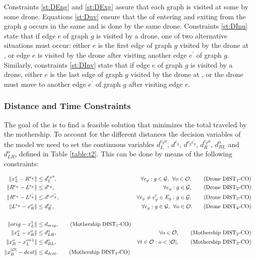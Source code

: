 \noindent 
{}  Constraints \eqref{st:DEng} and \eqref{st:DExg} assure that each graph is visited at some  by some drone. Equations \eqref{st:Duv} ensure that the  of entering and exiting from the graph $g$ occurs in the same  and is done by the same drone. Constraints \eqref{st:DInu} state that if  edge $e$ of graph $g$ is visited by a drone, one of two alternative situations must occur: either $e$ is the first edge of graph $g$ visited by the drone at , or edge $e$ is visited by the drone after visiting another edge $e^\prime$ of graph $g$. Similarly, constraints \eqref{st:DInv} state that if  edge $e$ of graph $g$ is visited by a drone, either $e$ is the last edge of graph $g$ visited by the drone at , or the drone must move to another edge $e^\prime$ of graph $g$ after visiting edge $e$.

\subsubsection*{Distance and Time Constraints}
\noindent
The goal of the \AMD\xspace is to find a feasible solution that minimizes the total  traveled by the mothership. To account for the different distances  the decision variables of the model we need to set the continuous variables $d_L^{e_go}$, $d^{e_g}$, $d^{e_ge^\prime_g}$, $d_R^{e_go}$, $d_{RL}^o$ and $d_{LR}^o$, defined in Table \ref{table:t2}. This can be done by means of the following constraints:

\begin{align*}
\|x_L^o- R^{e_g}\| & \leq  d_L^{e_go},  &\forall e_g:g\in \mathcal{G}, \:\:\forall o\in \mathcal O, \tag{Drone DIST$_{1}$-CO} \label{eq:drone-d1-async-CO}\\
\|R^{e_g}- L^{e_g}\| & \leq  d^{e_g},  &\forall e_g:g\in \mathcal{G}, \tag{Drone DIST$_{2}$-CO} \label{eq:drone-d2-async-CO}\\
\|R^{e_g}- L^{e'_g}\| & \leq  d^{e_ge'_g}, &\forall e_g\neq e_g'\in E_g:g\in \mathcal{G}, \tag{Drone DIST$_{3}$-CO} \label{eq:drone-d3-async-CO}\\
\|L^{e_g}- x_R^o\| & \leq  d_R^{e_o}, &\forall e_g:g\in \mathcal{G},\:\:\forall o\in \mathcal O. \tag{Drone DIST$_{4}$-CO} \label{eq:drone-d4-async-CO}\\\\
\|orig - x_L^1\| & \leq d_{orig}, \tag{Mothership DIST$_1$-CO}\label{eq:mothership-d1-async-CO}\\
\|x_L^o - x_R^{o}\| & \leq d_{LR}^{o}, &\forall o\in\mathcal O, \tag{Mothership DIST$_{2}$-CO}\label{eq:mothership-d3-async-CO}\\
\|x_R^o - x_L^{o+1}\| & \leq d_{RL}^{o}, &\forall t\in\mathcal O:o<|\mathcal O|, \tag{Mothership DIST$_{3}$-CO}\label{eq:mothership-d4-async-CO}\\
\|x_R^{|\mathcal O|} - dest\| & \leq d_{dest}. \tag{Mothership DIST$_4$-CO}\label{eq:mothership-d6-async-CO}
\end{align*}

